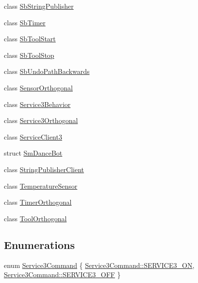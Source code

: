 \begin{DoxyCompactItemize}
\item 
class \hyperlink{classsm__dance__bot_1_1SbStringPublisher}{Sb\+String\+Publisher}
\item 
class \hyperlink{classsm__dance__bot_1_1SbTimer}{Sb\+Timer}
\item 
class \hyperlink{classsm__dance__bot_1_1SbToolStart}{Sb\+Tool\+Start}
\item 
class \hyperlink{classsm__dance__bot_1_1SbToolStop}{Sb\+Tool\+Stop}
\item 
class \hyperlink{classsm__dance__bot_1_1SbUndoPathBackwards}{Sb\+Undo\+Path\+Backwards}
\item 
class \hyperlink{classsm__dance__bot_1_1SensorOrthogonal}{Sensor\+Orthogonal}
\item 
class \hyperlink{classsm__dance__bot_1_1Service3Behavior}{Service3\+Behavior}
\item 
class \hyperlink{classsm__dance__bot_1_1Service3Orthogonal}{Service3\+Orthogonal}
\item 
class \hyperlink{classsm__dance__bot_1_1ServiceClient3}{Service\+Client3}
\item 
struct \hyperlink{structsm__dance__bot_1_1SmDanceBot}{Sm\+Dance\+Bot}
\item 
class \hyperlink{classsm__dance__bot_1_1StringPublisherClient}{String\+Publisher\+Client}
\item 
class \hyperlink{classsm__dance__bot_1_1TemperatureSensor}{Temperature\+Sensor}
\item 
class \hyperlink{classsm__dance__bot_1_1TimerOrthogonal}{Timer\+Orthogonal}
\item 
class \hyperlink{classsm__dance__bot_1_1ToolOrthogonal}{Tool\+Orthogonal}
\end{DoxyCompactItemize}
\subsection*{Enumerations}
\begin{DoxyCompactItemize}
\item 
enum \hyperlink{namespacesm__dance__bot_a2d0902aa29698165effd2c3248a9c8ff}{Service3\+Command} \{ \hyperlink{namespacesm__dance__bot_a2d0902aa29698165effd2c3248a9c8ffa13cdca48a01bbb44fa8fb35567fbc58e}{Service3\+Command\+::\+S\+E\+R\+V\+I\+C\+E3\+\_\+\+ON}, 
\hyperlink{namespacesm__dance__bot_a2d0902aa29698165effd2c3248a9c8ffa642ed22a7f6b816840289b4256116e9e}{Service3\+Command\+::\+S\+E\+R\+V\+I\+C\+E3\+\_\+\+O\+FF}
 \}
\end{DoxyCompactItemize}


